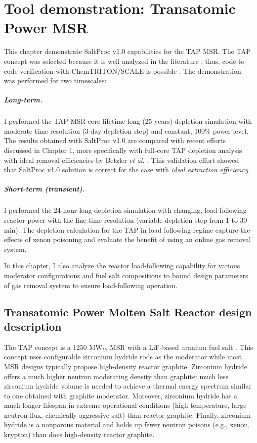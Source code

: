 \chapter{Tool demonstration: Transatomic Power MSR}

This chapter demonstrate SaltProc v1.0 capabilities for the \gls{TAP} 
\gls{MSR}. The \gls{TAP} concept was selected because it is well analyzed in 
the literature \cite{betzler_two-dimensional_2017, betzler_assessment_2017-1};
thus, code-to-code verification with ChemTRITON/SCALE is possible 
\cite{betzler_assessment_2017-1}. The demonstration was performed for two 
timescales:
\paragraph*{Long-term.} I performed the \gls{TAP} \gls{MSR} core lifetime-long 
(25 years) depletion simulation with moderate time resolution (3-day depletion 
step) and constant, 100\% power level. The 
results obtained with SaltProc v1.0 are compared with recent efforts discussed 
in Chapter 1, more specifically with full-core \gls{TAP} depletion analysis 
with ideal removal efficiencies by Betzler \emph{et al.}  
\cite{betzler_assessment_2017-1}. This validation effort showed that SaltProc 
v1.0 solution is correct for the case with \emph{ideal extraction efficiency}.
\paragraph*{Short-term (transient).} I performed the 24-hour-long depletion 
simulation with changing, load following reactor power with the fine time 
resolution (variable depletion step from 1 to 30-min). The depletion 
calculation for the \gls{TAP} in load following regime capture the effects of 
xenon poisoning and evaluate the benefit of using an online gas removal system.

In this chapter, I also analyze the reactor load-following capability for 
various moderator configurations and fuel salt compositions to bound design 
parameters of gas removal system to ensure load-following operation. 

\section{Transatomic Power Molten Salt Reactor design description}

The \gls{TAP} concept is a 1250 MW$_{th}$ \gls{MSR} with a LiF-based uranium 
fuel salt \cite{transatomic_power_corporation_technical_2016}. This concept 
uses configurable zirconium hydride rods as the moderator while most \gls{MSR} 
designs typically propose high-density reactor graphite. Zirconium hydride 
offers a much higher neutron moderating density than graphite: much less 
zirconium hydride volume is needed to achieve a thermal energy spectrum 
similar to one obtained with graphite moderator. Moreover, zirconium hydride 
has a much longer lifespan in extreme operational conditions (high 
temperature, large neutron flux, chemically aggressive salt) than reactor 
graphite. Finally, zirconium hydride is a nonporous material and holds up 
fewer neutron poisons (e.g., xenon, krypton) than does high-density 
reactor graphite.

